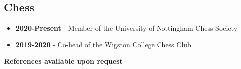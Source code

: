 \documentclass{article}
\begin{document}
\subsection{Chess}
\begin{itemize}[noitemsep]

\item \textbf{2020-Present} - Member of the University of Nottingham Chess Society
\item \textbf{2019-2020} - Co-head of the Wigston College Chess Club

\end{itemize}










%
%
%
%


\begin{center}

\vskip 0.5cm
\textbf{References available upon request}

\end{center}
\end{document}
